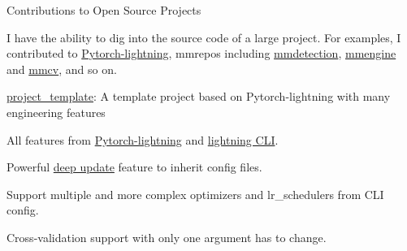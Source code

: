 
\begin{cventries}

	\cventry
	{} %
	{Contributions to Open Source Projects} %
	{\hfill} %
	{} %
	{
		\vspace{-3.5mm}
		\begin{cvitems} %
			\item{I have the ability to dig into the source code of a large project. For examples, I contributed to \href{https://github.com/Lightning-AI/lightning}{\textcolor{link}{Pytorch-lightning}}, mmrepos including \href{https://github.com/open-mmlab/mmdetection}{\textcolor{link}{mmdetection}}, \href{https://github.com/open-mmlab/mmengine}{\textcolor{link}{mmengine}} and \href{https://github.com/open-mmlab/mmcv}{\textcolor{link}{mmcv}}, and so on.}
		\end{cvitems}
	}

	\cventry
	{} %
	{\href{https://github.com/shenmishajing/project_template}{\textcolor{link}{project\_template}}: A template project based on Pytorch-lightning with many engineering features} %
	{\hfill} %
	{} %
	{
		\vspace{-3.5mm}
		\begin{cvitems} %
			\item{All features from \href{https://github.com/Lightning-AI/lightning}{\textcolor{link}{Pytorch-lightning}} and \href{https://pytorch-lightning.readthedocs.io/en/stable/cli/lightning_cli.html}{\textcolor{link}{lightning CLI}}.}
			\item{Powerful \href{https://github.com/shenmishajing/lightning_template/blob/main/docs/configs/deep_update.md}{\textcolor{link}{deep update}} feature to inherit config files.}
			\item{Support multiple and more complex optimizers and lr\_schedulers from CLI config.}
			\item{Cross-validation support with only one argument has to change.}
		\end{cvitems}
	}

\end{cventries}
